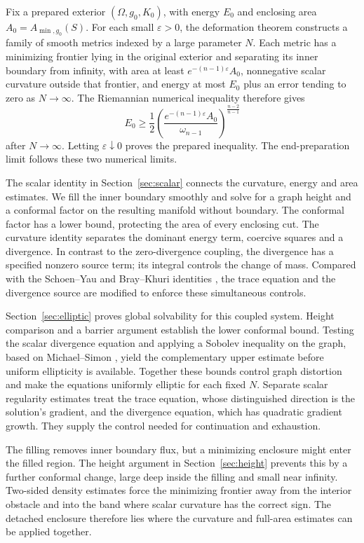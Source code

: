 Fix a prepared exterior $(\Omega,g_0,K_0)$, with energy $E_0$ and
enclosing area $A_0=A_{\min,g_0}(S)$. For each small $\varepsilon>0$,
the deformation theorem constructs a family of smooth metrics indexed
by a large parameter $N$. Each metric has a minimizing frontier lying in the original exterior
and separating its inner boundary from infinity, with area at least
$e^{-(n-1)\varepsilon}A_0$, nonnegative scalar
curvature outside that frontier, and energy at most $E_0$
plus an error tending to zero as $N\to\infty$. The Riemannian numerical
inequality therefore gives
\[
 E_0\geq
 \frac12\left(\frac{e^{-(n-1)\varepsilon}A_0}
 {\omega_{n-1}}\right)^{\frac{n-2}{n-1}}
\]
after $N\to\infty$. Letting $\varepsilon\downarrow0$ proves the
prepared inequality. The end-preparation limit follows these two numerical limits.

The scalar identity in Section~\ref{sec:scalar} connects the curvature,
energy and area estimates. We fill
the inner boundary smoothly and solve for a graph height and a conformal
factor on the resulting manifold without boundary. The conformal
factor has a lower bound, protecting the area of every enclosing cut.
The curvature identity separates the dominant energy term, coercive
squares and a divergence. In contrast to the zero-divergence coupling,
the divergence has a specified nonzero source term; its integral controls
the change of mass. Compared with the Schoen--Yau and Bray--Khuri
identities \cite{SchoenYau1981,BrayKhuri2011}, the trace equation and the
divergence source are modified to enforce these simultaneous controls.

Section~\ref{sec:elliptic} proves global solvability for this coupled system. Height
comparison and a barrier argument establish the lower conformal bound.
Testing the scalar divergence equation and applying a Sobolev inequality
on the graph, based on Michael--Simon \cite{MichaelSimon1973}, yield the
complementary upper estimate before uniform ellipticity is available.
Together these bounds control graph distortion and make the equations
uniformly elliptic for each fixed $N$.
Separate scalar regularity estimates treat the trace equation, whose
distinguished direction is the solution's gradient, and the divergence
equation, which has quadratic gradient growth. They supply the control
needed for continuation and exhaustion.

The filling removes inner boundary flux, but a minimizing enclosure
might enter the filled region. The height argument in Section~\ref{sec:height} prevents this by a further conformal
change, large deep inside the filling and small near infinity. Two-sided
density estimates force the minimizing frontier away from the interior
obstacle and into the band where scalar curvature has the correct sign.
The detached enclosure therefore lies where the curvature and full-area
estimates can be applied together.

